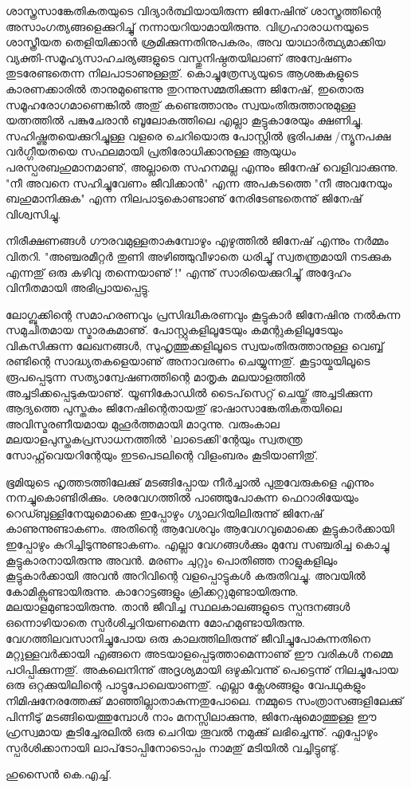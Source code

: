 ശാസ്ത്രസാങ്കേതികതയുടെ വിദ്യാര്‍ത്ഥിയായിരുന്ന ജിനേഷിനു് ശാസ്ത്രത്തിന്റെ അസാംഗത്യങ്ങളെക്കുറിച്ചു് നന്നായറിയാമായിരുന്നു. വിഗ്രഹാരാധനയുടെ ശാസ്ത്രീയത തെളിയിക്കാന്‍ ശ്രമിക്കുന്നതിനുപകരം, അവ യാഥാര്‍ത്ഥ്യമാക്കിയ വ്യക്തി-സമൂഹ്യസാഹചര്യങ്ങളുടെ വസ്തുനിഷ്ഠതയിലാണ് അന്വേഷണം തുടരേണ്ടതെന്ന നിലപാടാണുള്ളതു്. കൊച്ചുത്രേസ്യയുടെ ആശങ്കകളുടെ കാരണക്കാരില്‍ താനുമുണ്ടെന്നു തുറന്നുസമ്മതിക്കുന്ന ജിനേഷ്, ഇതൊരു സമൂഹരോഗമാണെങ്കില്‍ അതു് കണ്ടെത്താനും സ്വയംതിരുത്താനുമുള്ള യത്നത്തില്‍ പങ്കുചേരാന്‍ ബൂലോകത്തിലെ എല്ലാ കൂട്ടുകാരേയും ക്ഷണിച്ചു. സഹിഷ്ണുതയെക്കുറിച്ചുള്ള വളരെ ചെറിയൊരു പോസ്റ്റില്‍ ഭൂരിപക്ഷ /ന്യൂനപക്ഷ വര്‍ഗ്ഗീയതയെ സഫലമായി പ്രതിരോധിക്കാനുള്ള ആയുധം പരസ്പരബഹുമാനമാണു്, അല്ലാതെ സഹനമല്ല എന്നും ജിനേഷ് വെളിവാക്കുന്നു.  "നീ അവനെ സഹിച്ചുവേണം ജീവിക്കാന്‍" എന്ന അപകടത്തെ "നീ അവനേയും ബഹുമാനിക്കുക" എന്ന നിലപാടുകൊണ്ടാണു് നേരിടേണ്ടതെന്നു് ജിനേഷ് വിശ്വസിച്ചു.

നിരീക്ഷണങ്ങള്‍ ഗൗരവമുള്ളതാകുമ്പോഴും എഴുത്തില്‍ ജിനേഷ് എന്നും നര്‍മ്മം വിതറി. "അഞ്ചരമീറ്റര്‍ തുണി അഴിഞ്ഞുവീഴാതെ ധരിച്ചു് സ്വതന്ത്രമായി നടക്കുക എന്നതു് ഒരു കഴിവു തന്നെയാണു് !" എന്നു് സാരിയെക്കുറിച്ചു് അദ്ദേഹം വിനീതമായി അഭിപ്രായപ്പെട്ടു.

ലോഗ്ബുക്കിന്റെ സമാഹരണവും പ്രസിദ്ധീകരണവും കൂട്ടുകാര്‍ ജിനേഷിനു നല്‍കുന്ന സമുചിതമായ സ്മാരകമാണു്. പോസ്റ്റുകളിലൂടേയും കമന്റുകളിലൂടേയും വികസിക്കുന്ന ലേഖനങ്ങള്‍, സുഹൃത്തുക്കളിലൂടെ സ്വയംതിരുത്താനുള്ള വെബ്ബ് രണ്ടിന്റെ സാദ്ധ്യതകളെയാണു് അനാവരണം ചെയ്യുന്നതു്. കൂട്ടായ്മയിലൂടെ രൂപപ്പെടുന്ന സത്യാന്വേഷണത്തിന്റെ മാതൃക മലയാളത്തില്‍ അച്ചടിക്കപ്പെടുകയാണു്. യൂണികോഡില്‍ ടൈപ്‌സെറ്റ് ചെയ്തു് അച്ചടിക്കുന്ന ആദ്യത്തെ പുസ്തകം ജിനേഷിന്റെതായതു് ഭാഷാസാങ്കേതികതയിലെ അവിസ്മരണീയമായ മുഹൂര്‍ത്തമായി മാറുന്നു. വരുംകാല മലയാളപുസ്തകപ്രസാധനത്തില്‍ 'ലാടെക്കി'ന്റേയും സ്വതന്ത്ര സോഫ്റ്റ്‌വെയറിന്റേയും ഇടപെടലിന്റെ വിളംബരം കൂടിയാണിതു്. 

ഭൂമിയുടെ ഹൃത്തടത്തിലേക്കു് മടങ്ങിപ്പോയ നീര്‍ച്ചാല്‍ പുതുവേരുകളെ എന്നും നനച്ചുകൊണ്ടിരിക്കും. ശരവേഗത്തില്‍ പാഞ്ഞുപോകുന്ന ഫെറാരിയേയും റെഡ്ബുള്ളിനേയുമൊക്കെ ഇപ്പോഴും ഗ്യാലറിയിലിരുന്നു് ജിനേഷ് കാണുന്നുണ്ടാകണം. അതിന്റെ ആവേശവും ആവേഗവുമൊക്കെ കൂട്ടുകാര്‍ക്കായി ഇപ്പോഴും കുറിച്ചിടുന്നുണ്ടാകണം. എല്ലാ വേഗങ്ങള്‍ക്കും മുമ്പേ സഞ്ചരിച്ച കൊച്ചു കൂട്ടുകാരനായിരുന്നു അവന്‍. മരണം ചുറ്റും പൊതിഞ്ഞ നാളുകളിലും കൂട്ടുകാര്‍ക്കായി അവന്‍ അറിവിന്റെ വളപ്പൊട്ടുകള്‍ കരുതിവച്ചു. അവയില്‍ കോമിക്സുണ്ടായിരുന്നു. കാറോട്ടങ്ങളും ക്രിക്കറ്റുമുണ്ടായിരുന്നു. മലയാളമുണ്ടായിരുന്നു. താന്‍ ജീവിച്ച സ്ഥലകാലങ്ങളുടെ സ്പന്ദനങ്ങള്‍ ഒന്നൊഴിയാതെ സ്പര്‍ശിച്ചറിയണമെന്ന മോഹമുണ്ടായിരുന്നു. വേഗത്തിലവസാനിച്ചുപോയ ഒരു കാലത്തിലിരുന്നു് ജീവിച്ചുപോകുന്നതിനെ മറ്റുള്ളവര്‍ക്കായി എങ്ങനെ അടയാളപ്പെടുത്താമെന്നാണു് ഈ വരികള്‍ നമ്മെ പഠിപ്പിക്കുന്നതു്. അകലെനിന്നു് അദൃശ്യമായി ഒഴുകിവന്നു് പെട്ടെന്നു് നിലച്ചുപോയ ഒരു ഒറ്റക്കുയിലിന്റെ പാട്ടുപോലെയാണതു്. എല്ലാ ക്ലേശങ്ങളും വേപഥുകളും നിമിഷനേരത്തേക്കു് മാഞ്ഞില്ലാതാകുന്നതുപോലെ. നമ്മുടെ സംത്രാസങ്ങളിലേക്കു് പിന്നീടു് മടങ്ങിയെത്തുമ്പോള്‍ നാം മനസ്സിലാക്കുന്നു, ജിനേഷുമൊത്തുള്ള ഈ ഹ്രസ്വമായ കൂടിച്ചേരലില്‍ ഒരു ചെറിയ തൂവല്‍ നമുക്കു് ലഭിച്ചെന്നു്. എപ്പോഴും സ്പര്‍ശിക്കാനായി ലാപ്‌ടോപ്പിനോടൊപ്പം നാമതു് മടിയില്‍ വച്ചിട്ടുണ്ടു്.

ഹുസൈന്‍ കെ.എച്ച്. 
\newpage
